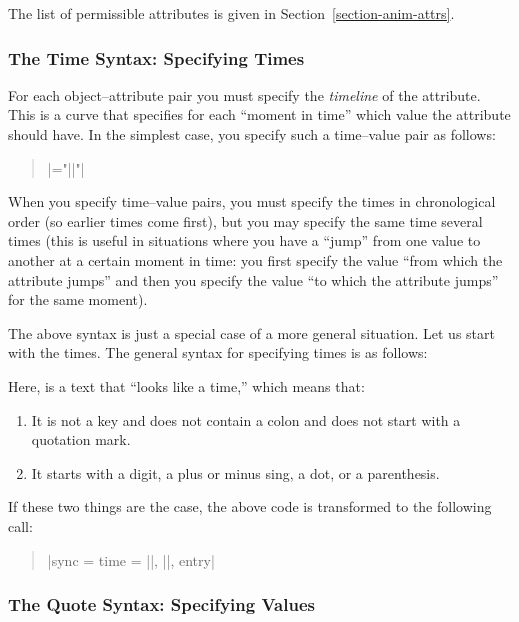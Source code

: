 The list of permissible attributes is given in
Section~\ref{section-anim-attrs}. 

    
\subsubsection{The Time Syntax: Specifying Times}

\label{section-anim-timeline}

For each object--attribute pair you must specify the \emph{timeline}
of the attribute. This is a curve that specifies for each ``moment in
time'' which value the attribute should have. In the simplest case,
you specify such a time--value pair as follows:
\begin{quote}
  \normalfont
   |="||"|    
\end{quote}

When you specify time--value pairs, you must specify the times in
chronological order (so earlier times come first), but you may specify
the same time several times (this is useful in situations where you
have a ``jump'' from one value to another at a certain moment in
time: you first specify the value ``from which the attribute jumps''
and then you specify the value ``to which the attribute jumps'' for
the same moment).  

The above syntax is just a special case of a more general
situation. Let us start with the times. The general syntax for
specifying times is as follows:

\begin{quote}
  \normalfont
   
\end{quote}

Here,  is a text that ``looks like a time,'' which means
that:
\begin{enumerate}
\item It is not a key and does not contain a colon and does not start
  with a quotation mark.
\item It starts with a digit, a plus or minus sing, a dot, or a
  parenthesis. 
\end{enumerate}

If these two things are the case, the above code is transformed to the
following call:
\begin{quote}
  \normalfont
  |sync = {time = ||, ||, entry}|
\end{quote}


\subsubsection{The Quote Syntax: Specifying Values}


